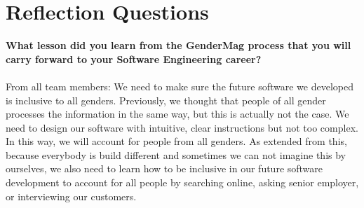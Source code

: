 \documentclass[12pt, titlepage]{article}
\begin{document}
\section{Reflection Questions}
\textbf{What lesson did you learn from the GenderMag process that you will carry forward to your Software Engineering career?}\\\\
From all team members: We need to make sure the future software we developed is inclusive to all genders. Previously, we thought that people of all gender processes the information in the same way, but this is actually not the case. We need to design our software with intuitive, clear instructions but not too complex. In this way, we will account for people from all genders. As extended from this, because everybody is build different and sometimes we can not imagine this by ourselves, we also need to learn how to be inclusive in our future software development to account for all people by searching online, asking senior employer, or interviewing our customers.
\end{document}

